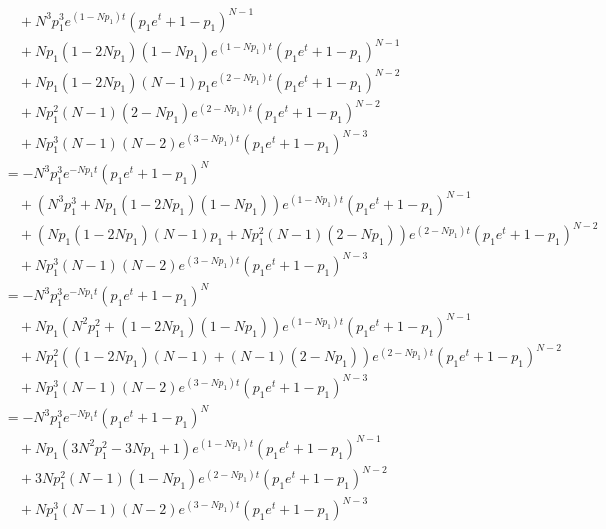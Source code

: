 \documentclass[dvipdfmx]{jsarticle}
\begin{document}
\begin{align}
  &\quad+N^3p_1^3e^{\left(1-Np_1\right)t}\left(p_1e^t+1-p_1\right)^{N-1}\nonumber\\
  &\quad+Np_1\left(1-2Np_1\right)\left(1-Np_1\right)e^{\left(1-Np_1\right)t}\left(p_1e^t+1-p_1\right)^{N-1}\nonumber\\
  &\quad+Np_1\left(1-2Np_1\right)\left(N-1\right)p_1e^{\left(2-Np_1\right)t}\left(p_1e^t+1-p_1\right)^{N-2}\nonumber\\
  &\quad+Np_1^2\left(N-1\right)\left(2-Np_1\right)e^{\left(2-Np_1\right)t}\left(p_1e^t+1-p_1\right)^{N-2}\nonumber\\
  &\quad+Np_1^3\left(N-1\right)\left(N-2\right)e^{\left(3-Np_1\right)t}\left(p_1e^t+1-p_1\right)^{N-3}\nonumber\\
  &=-N^3p_1^3e^{-Np_1t}\left(p_1e^t+1-p_1\right)^N\nonumber\\
  &\quad+\left(N^3p_1^3+Np_1\left(1-2Np_1\right)\left(1-Np_1\right)\right)e^{\left(1-Np_1\right)t}\left(p_1e^t+1-p_1\right)^{N-1}\nonumber\\
  &\quad+\left(Np_1\left(1-2Np_1\right)\left(N-1\right)p_1+Np_1^2\left(N-1\right)\left(2-Np_1\right)\right)e^{\left(2-Np_1\right)t}\left(p_1e^t+1-p_1\right)^{N-2}\nonumber\\
  &\quad+Np_1^3\left(N-1\right)\left(N-2\right)e^{\left(3-Np_1\right)t}\left(p_1e^t+1-p_1\right)^{N-3}\nonumber\\
  &=-N^3p_1^3e^{-Np_1t}\left(p_1e^t+1-p_1\right)^N\nonumber\\
  &\quad+Np_1\left(N^2p_1^2+\left(1-2Np_1\right)\left(1-Np_1\right)\right)e^{\left(1-Np_1\right)t}\left(p_1e^t+1-p_1\right)^{N-1}\nonumber\\
  &\quad+Np_1^2\left(\left(1-2Np_1\right)\left(N-1\right)+\left(N-1\right)\left(2-Np_1\right)\right)e^{\left(2-Np_1\right)t}\left(p_1e^t+1-p_1\right)^{N-2}\nonumber\\
  &\quad+Np_1^3\left(N-1\right)\left(N-2\right)e^{\left(3-Np_1\right)t}\left(p_1e^t+1-p_1\right)^{N-3}\nonumber\\
  &=-N^3p_1^3e^{-Np_1t}\left(p_1e^t+1-p_1\right)^N\nonumber\\
  &\quad+Np_1\left(3N^2p_1^2-3Np_1+1\right)e^{\left(1-Np_1\right)t}\left(p_1e^t+1-p_1\right)^{N-1}\nonumber\\
  &\quad+3Np_1^2\left(N-1\right)\left(1-Np_1\right)e^{\left(2-Np_1\right)t}\left(p_1e^t+1-p_1\right)^{N-2}\nonumber\\
  &\quad+Np_1^3\left(N-1\right)\left(N-2\right)e^{\left(3-Np_1\right)t}\left(p_1e^t+1-p_1\right)^{N-3}\nonumber\\
 \end{align}
\end{document}
